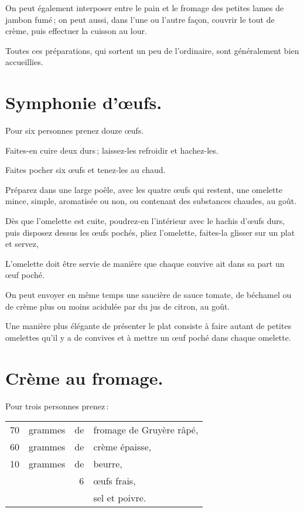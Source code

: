On peut également interposer entre le pain et le fromage des petites lames de
jambon fumé ; on peut aussi, dans l’une ou l’autre façon, couvrir le tout de
crème, puis effectuer la cuisson au lour.

Toutes ces préparations, qui sortent un peu de l'ordinaire, sont généralement
bien accueillies.

\section*{\centering Symphonie d'œufs.}

Pour six personnes prenez douze œufs.

Faites-en cuire deux durs ; laissez-les refroidir et hachez-les.

Faites pocher six œufs et tenez-les au chaud.

Préparez dans une large poêle, avec les quatre œufs qui restent, une omelette
mince, simple, aromatisée ou non, ou contenant des substances chaudes, au goût.

Dès que l'omelette est cuite, poudrez-en l'intérieur avec le hachis d'œufs
durs, puis disposez dessus les œufs pochés, pliez l'omelette, faites-la glisser
sur un plat et servez,

L'omelette doit être servie de manière que chaque convive ait dans sa part un
œuf poché.

On peut envoyer en même temps une saucière de sauce tomate, de béchamel ou de
crème plus ou moins acidulée par du jus de citron, au goût.

Une manière plus élégante de présenter le plat consiste à faire autant de petites
omelettes qu'il y a de convives et à mettre un œuf poché dans chaque omelette.

\section*{\centering Crème au fromage.}

Pour trois personnes prenez :

\medskip

\footnotesize
\begin{longtable}{rrrp{16em}}
   70 & grammes & de & fromage de Gruyère râpé,                                                           \\
   60 & grammes & de & crème épaisse,                                                                     \\
   10 & grammes & de & beurre,                                                                            \\
      &         &  6 & œufs frais,                                                                        \\
      &         &    & sel et poivre.                                                                     \\
\end{longtable}
\normalsize

